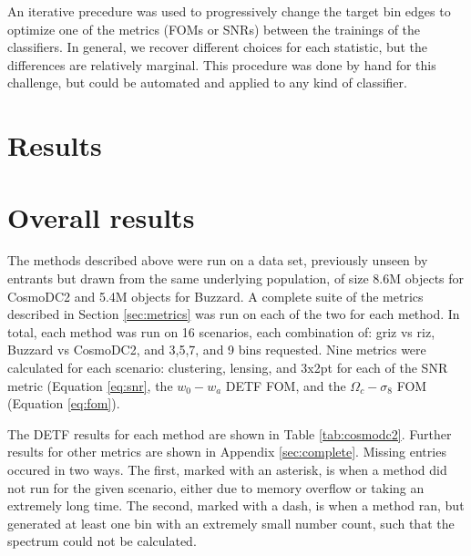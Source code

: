 \documentclass[twocolumn,twocolappendix]{aastex63}
\begin{document}
An iterative precedure was used to progressively change the target bin edges to optimize one of the metrics (FOMs or SNRs) between the trainings of the classifiers. In general, we recover different choices for each statistic, but the differences are relatively marginal. This procedure was done by hand for this challenge, but could be automated and applied to any kind of classifier.


 
        




\section{Results}

\section{Overall results}
The methods described above were run on a data set, previously unseen by entrants but drawn
from the same underlying population, of size 8.6M objects for CosmoDC2 and 5.4M objects for Buzzard.
A complete suite of the metrics described in Section \ref{sec:metrics} was run on each of the two
for each method.  In total, each method was run on 16 scenarios, each combination of: griz vs riz,
Buzzard vs CosmoDC2, and 3,5,7, and 9 bins requested.  Nine metrics were calculated for each
scenario: clustering, lensing, and 3x2pt for each of the SNR metric (Equation \ref{eq:snr}, the $w_0-w_a$ 
DETF FOM, and the $\Omega_c - \sigma_8$ FOM (Equation \ref{eq:fom}).

The DETF results for each method are shown in Table \ref{tab:cosmodc2}.  Further results for other
metrics are shown in Appendix \ref{sec:complete}.  Missing entries occured in two ways.
The first, marked with an asterisk, is when a method did not run for the given scenario,
either due to memory overflow or taking an extremely long time.
The second, marked with a dash, is when a method ran, but generated at least one bin with an extremely small number
count, such that the spectrum could not be calculated.
\end{document}
